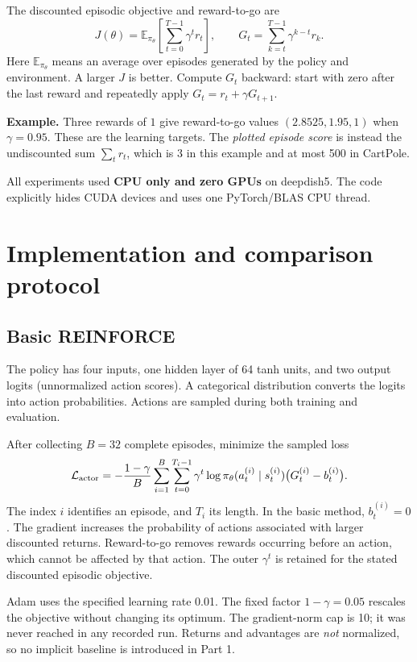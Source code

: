 \documentclass[11pt,letterpaper]{article}
\newcommand{\E}{\mathbb{E}}
\begin{document}
The discounted episodic objective and reward-to-go are
\begin{equation}
J(\theta)=\E_{\pi_\theta}\!\left[\sum_{t=0}^{T-1}\gamma^t r_t\right],
\qquad
G_t=\sum_{k=t}^{T-1}\gamma^{k-t}r_k.
\end{equation}
Here $\E_{\pi_\theta}$ means an average over episodes generated by the policy and environment. A larger $J$ is better. Compute $G_t$ backward: start with zero after the last reward and repeatedly apply $G_t=r_t+\gamma G_{t+1}$.

\textbf{Example.} Three rewards of $1$ give reward-to-go values $(2.8525,1.95,1)$ when $\gamma=0.95$. These are the learning targets. The \emph{plotted episode score} is instead the undiscounted sum $\sum_t r_t$, which is 3 in this example and at most 500 in CartPole.

All experiments used \textbf{CPU only and zero GPUs} on deepdish5. The code explicitly hides CUDA devices and uses one PyTorch/BLAS CPU thread.

\clearpage
\section{Implementation and comparison protocol}
\subsection{Basic REINFORCE}
The policy has four inputs, one hidden layer of 64 tanh units, and two output logits (unnormalized action scores). A categorical distribution converts the logits into action probabilities. Actions are sampled during both training and evaluation.

After collecting $B=32$ complete episodes, minimize the sampled loss
\begin{equation}
\mathcal L_{\rm actor}
=-\frac{1-\gamma}{B}\sum_{i=1}^{B}\sum_{t=0}^{T_i-1}
\gamma^t\log\pi_\theta(a_t^{(i)}\mid s_t^{(i)})
\bigl(G_t^{(i)}-b_t^{(i)}\bigr).
\label{eq:actor}
\end{equation}
The index $i$ identifies an episode, and $T_i$ its length. In the basic method, $b_t^{(i)}=0$. The gradient increases the probability of actions associated with larger discounted returns. Reward-to-go removes rewards occurring before an action, which cannot be affected by that action. The outer $\gamma^t$ is retained for the stated discounted episodic objective.

Adam uses the specified learning rate 0.01. The fixed factor $1-\gamma=0.05$ rescales the objective without changing its optimum. The gradient-norm cap is 10; it was never reached in any recorded run. Returns and advantages are \emph{not} normalized, so no implicit baseline is introduced in Part 1.
\end{document}
